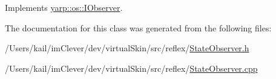 Implements \hyperlink{classyarp_1_1os_1_1_i_observer_a4829e5a6f2ba6666b9539a4a30f20790}{yarp::os::IObserver}.

The documentation for this class was generated from the following files:\begin{DoxyCompactItemize}
\item 
/Users/kail/imClever/dev/virtualSkin/src/reflex/\hyperlink{_state_observer_8h}{StateObserver.h}\item 
/Users/kail/imClever/dev/virtualSkin/src/reflex/\hyperlink{_state_observer_8cpp}{StateObserver.cpp}\end{DoxyCompactItemize}
